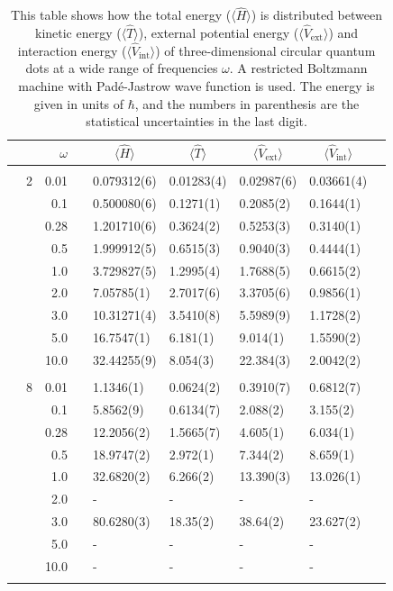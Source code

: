 \begin{table}
	\caption{This table shows how the total energy ($\langle\hat{H}\rangle$) is distributed between kinetic energy ($\langle\hat{T}\rangle$), external potential energy ($\langle\hat{V}_{\text{ext}}\rangle$) and interaction energy ($\langle\hat{V}_{\text{int}}\rangle$) of three-dimensional circular quantum dots at a wide range of frequencies $\omega$. A restricted Boltzmann machine with Padé-Jastrow wave function is used. The energy is given in units of $\hbar$, and the numbers in parenthesis are the statistical uncertainties in the last digit.}
	\label{tab:splitfrequencyQDRBMPJ3D}
	\begin{tabularx}{\textwidth}{R{1cm}rrcR{2.3cm}R{2.3cm}R{2.3cm}R{2.3cm}R{1cm}} \hline\hline
		&\makecell{\\ \phantom{$N$} \\ \phantom{=}} & $\omega$ &&  &  &  &  & \\ \hline \\
		&2 & 0.01 && 0.079312(6) & 0.01283(4) & 0.02987(6) & 0.03661(4) \\
		&& 0.1 && 0.500080(6) & 0.1271(1) & 0.2085(2) & 0.1644(1) \\
		&& 0.28 && 1.201710(6) & 0.3624(2) & 0.5253(3) & 0.3140(1) \\
		&& 0.5 && 1.999912(5) & 0.6515(3) & 0.9040(3) & 0.4444(1) \\
		&& 1.0 && 3.729827(5) & 1.2995(4) & 1.7688(5) & 0.6615(2) \\
		&& 2.0 && 7.05785(1) & 2.7017(6) & 3.3705(6) & 0.9856(1) \\
		&& 3.0 && 10.31271(4) & 3.5410(8) & 5.5989(9) & 1.1728(2) \\ 
		&& 5.0 && 16.7547(1) & 6.181(1) & 9.014(1) & 1.5590(2) \\
		&& 10.0 && 32.44255(9) & 8.054(3) & 22.384(3) & 2.0042(2) \\
		\hdashline \\
		
		&8 & 0.01 && 1.1346(1) & 0.0624(2) & 0.3910(7) & 0.6812(7) \\
		&& 0.1 && 5.8562(9) & 0.6134(7) & 2.088(2) & 3.155(2) \\
		&& 0.28 && 12.2056(2) & 1.5665(7) & 4.605(1) & 6.034(1) \\
		&& 0.5 && 18.9747(2) & 2.972(1) & 7.344(2) & 8.659(1) \\
		&& 1.0 && 32.6820(2) & 6.266(2) & 13.390(3) & 13.026(1) \\
		&& 2.0 && - & - & - & -\\
		&& 3.0 && 80.6280(3) & 18.35(2) & 38.64(2) & 23.627(2) \\ 
		&& 5.0 && - & - & - & -\\
		&& 10.0 && - & - & - & -\\
		\hdashline \\
		

\end{tabularx}
\end{table}
